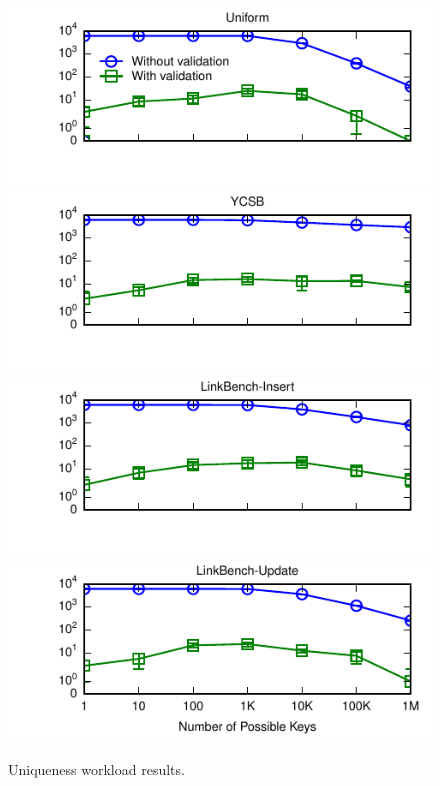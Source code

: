 \begin{figure}
\includegraphics[width=\columnwidth]{figs/pk-workload-uniform-violations.pdf}\vspace{-2em}
\includegraphics[width=\columnwidth]{figs/pk-workload-ycsb-violations.pdf}\vspace{-2em}
\includegraphics[width=\columnwidth]{figs/pk-workload-linkbench-ins-violations.pdf}\vspace{-2em}
\includegraphics[width=\columnwidth]{figs/pk-workload-linkbench-upd-violations.pdf}\vspace{-1em}
\caption{Uniqueness workload results.}
\label{fig:pk-workload}
\end{figure}


